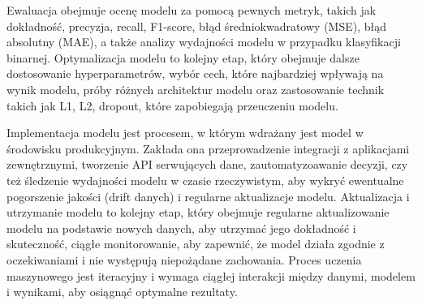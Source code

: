 Ewaluacja obejmuje ocenę modelu za pomocą pewnych metryk,
takich jak dokładność, precyzja, recall, F1-score, błąd średniokwadratowy (MSE),
błąd absolutny (MAE), a także analizy wydajności modelu w przypadku klasyfikacji binarnej.
Optymalizacja modelu to kolejny etap, który obejmuje dalsze dostosowanie hyperparametrów,
wybór cech, które najbardziej wpływają na wynik modelu,
próby różnych architektur modelu oraz zastosowanie technik takich jak L1, L2, dropout,
które zapobiegają przeuczeniu modelu.

Implementacja modelu jest procesem, w którym wdrażany jest model w środowisku produkcyjnym.
Zakłada ona przeprowadzenie integracji z aplikacjami zewnętrznymi, tworzenie API serwujących dane,
zautomatyzoawanie decyzji, czy też śledzenie wydajności modelu w czasie rzeczywistym,
aby wykryć ewentualne pogorszenie jakości (drift danych) i regularne aktualizacje modelu.
Aktualizacja i utrzymanie modelu to kolejny etap,
który obejmuje regularne aktualizowanie modelu na podstawie nowych danych,
aby utrzymać jego dokładność i skuteczność, ciągłe monitorowanie,
aby zapewnić, że model działa zgodnie z oczekiwaniami i nie występują niepożądane zachowania.
Proces uczenia maszynowego jest iteracyjny i wymaga ciągłej interakcji między danymi,
modelem i wynikami, aby osiągnąć optymalne rezultaty.